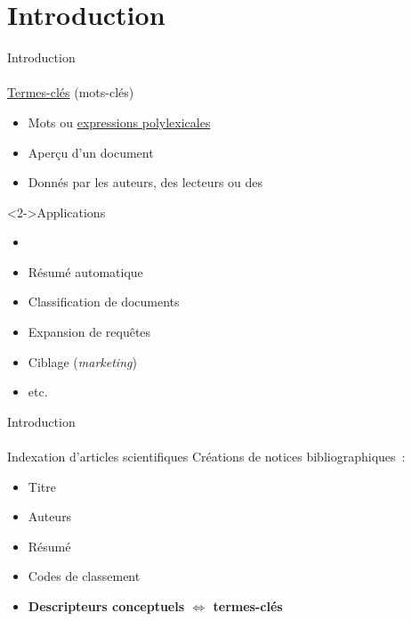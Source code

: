 \section*{Introduction}
  \begin{frame}{Introduction}
  \framesubtitle{}%

    \begin{block}{\underline{Termes-clés} (mots-clés)}
      \begin{itemize}\small
        \item{Mots ou \underline{expressions polylexicales}}
        \item{Aperçu d'un document}
        \item{Donnés par les auteurs, des lecteurs ou des }
      \end{itemize}
    \end{block}

    \begin{block}<2->{Applications}
      \begin{minipage}{.5\linewidth}
        \begin{itemize}\small
          \item{}
          \item{Résumé automatique}
          \item{Classification de documents}
        \end{itemize}
      \end{minipage}
      \begin{minipage}{.48\linewidth}
        \begin{itemize}\small
          \item{Expansion de requêtes}
          \item{Ciblage (\textit{marketing})}
          \item{etc.}
        \end{itemize}
      \end{minipage}
    \end{block}
  \end{frame}

  \begin{frame}{Introduction}
  \framesubtitle{}%

    \begin{block}{Indexation d'articles scientifiques}
      Créations de notices bibliographiques~:
      \begin{itemize}\small
        \item{Titre}
        \item{Auteurs}
        \item{Résumé}
        \item{Codes de classement}
        \item{\textbf{Descripteurs conceptuels $\Leftrightarrow$ termes-clés}}
      \end{itemize}
    \end{block}
  \end{frame}

